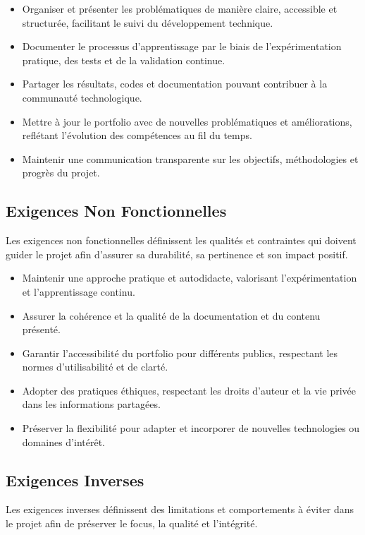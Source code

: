 \documentclass[10pt, a4paper, oneside]{article}
\begin{document}
\begin{itemize}
    \item Organiser et présenter les problématiques de manière claire, accessible et structurée, facilitant le suivi du développement technique.
    \item Documenter le processus d’apprentissage par le biais de l’expérimentation pratique, des tests et de la validation continue.
    \item Partager les résultats, codes et documentation pouvant contribuer à la communauté technologique.
    \item Mettre à jour le portfolio avec de nouvelles problématiques et améliorations, reflétant l’évolution des compétences au fil du temps.
    \item Maintenir une communication transparente sur les objectifs, méthodologies et progrès du projet.
\end{itemize}

\subsection{Exigences Non Fonctionnelles}

Les exigences non fonctionnelles définissent les qualités et contraintes qui doivent guider le projet afin d’assurer sa durabilité, sa pertinence et son impact positif.

\begin{itemize}
    \item Maintenir une approche pratique et autodidacte, valorisant l’expérimentation et l’apprentissage continu.
    \item Assurer la cohérence et la qualité de la documentation et du contenu présenté.
    \item Garantir l’accessibilité du portfolio pour différents publics, respectant les normes d’utilisabilité et de clarté.
    \item Adopter des pratiques éthiques, respectant les droits d’auteur et la vie privée dans les informations partagées.
    \item Préserver la flexibilité pour adapter et incorporer de nouvelles technologies ou domaines d’intérêt.
\end{itemize}

\subsection{Exigences Inverses}

Les exigences inverses définissent des limitations et comportements à éviter dans le projet afin de préserver le focus, la qualité et l’intégrité.
\end{document}
